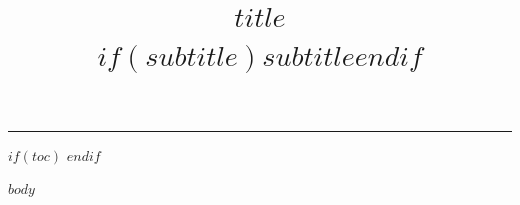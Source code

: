 \documentclass[11pt, a4paper]{article}
\author{}
\title{%
    \vspace{-1.5em}%
    \sffamily\bfseries\Large\textcolor{deblue}{$title$}\\[4pt]
    \normalfont\normalsize\textcolor{degray}{$if(subtitle)$$subtitle$$endif$}%
  }
\title{}
\begin{document}
\maketitle
\vspace{-1em}
{\color{rulegray}\rule{\linewidth}{0.8pt}}
\vspace{0.5em}
\thispagestyle{fancy}

$if(toc)$
\tableofcontents
\clearpage
$endif$

$body$
\end{document}
